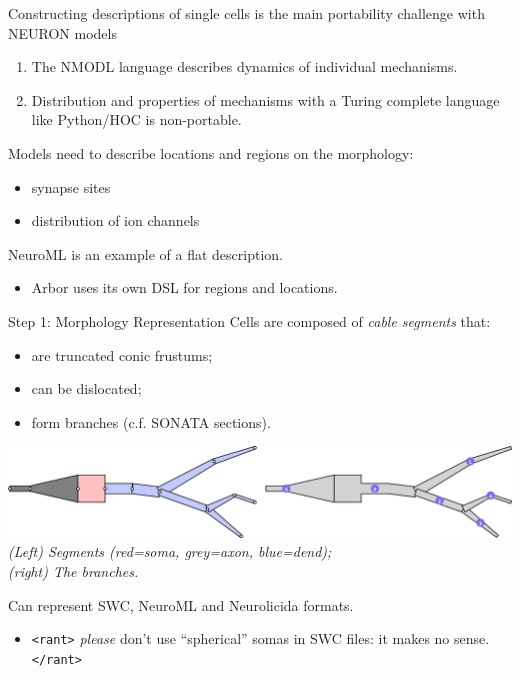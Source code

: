 \documentclass[aspectratio=43]{beamer}
\begin{document}

\begin{frame}[fragile]{}
    Constructing descriptions of single cells is the main portability challenge with NEURON models
    \begin{enumerate}
        \item The NMODL language describes dynamics of individual mechanisms.
        \item Distribution and properties of mechanisms with a Turing complete language
              like Python/HOC is non-portable.
    \end{enumerate}

    Models need to describe locations and regions on the morphology:
    \begin{itemize}
        \item synapse sites
        \item distribution of ion channels
    \end{itemize}

    NeuroML is an example of a flat description.
    \begin{itemize}
        \item Arbor uses its own DSL for regions and locations.
    \end{itemize}
\end{frame}

\begin{frame}[fragile]{Step 1: Morphology Representation}
    Cells are composed of \emph{cable segments} that:
    \begin{itemize}
        \item are truncated conic frustums;
        \item can be dislocated;
        \item form branches (c.f. SONATA sections).
    \end{itemize}

    \begin{center}
        \includegraphics[width=\textwidth]{./morphos/morphlab.png}
        \\
        \small \textit{(Left) Segments (red=soma, grey=axon, blue=dend);\\(right) The branches.}
    \end{center}

    Can represent SWC, NeuroML and Neurolicida formats.
    \begin{itemize}
        \item \texttt{<rant>} \textit{please} don't use ``spherical'' somas in SWC files: it makes no sense. \texttt{</rant>}
    \end{itemize}

\end{frame}
\end{document}
